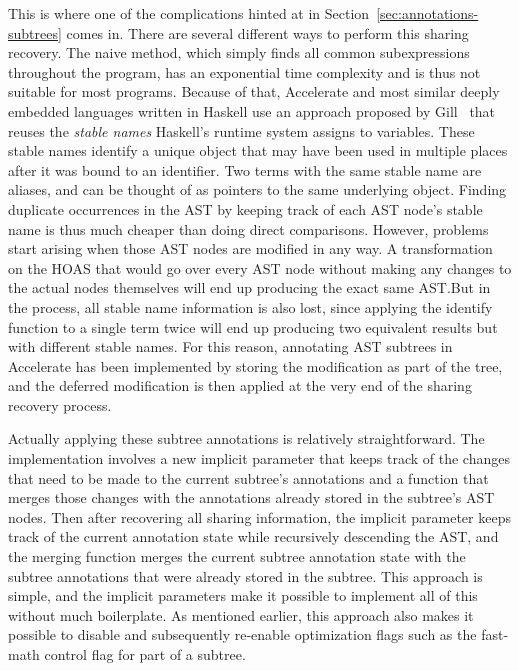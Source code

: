 \documentclass[fontsize=11pt,a4paper,parskip=half,numbers=noenddot]{scrartcl}
\begin{document}
This is where one of the complications hinted at in
Section~\ref{sec:annotations-subtrees} comes in. There are several different
ways to perform this sharing recovery. The naive method, which simply finds all
common subexpressions throughout the program, has an exponential time complexity
and is thus not suitable for most programs. Because of that, Accelerate and most
similar deeply embedded languages written in Haskell use an approach proposed by
Gill~\cite{gill2009type} that reuses the \emph{stable names} Haskell's runtime
system assigns to variables. These stable names identify a unique object that
may have been used in multiple places after it was bound to an identifier. Two
terms with the same stable name are aliases, and can be thought of as pointers
to the same underlying object. Finding duplicate occurrences in the AST by
keeping track of each AST node's stable name is thus much cheaper than doing
direct comparisons. However, problems start arising when those AST nodes are
modified in any way. A transformation on the HOAS that would go over every AST
node without making any changes to the actual nodes themselves will end up
producing the exact same AST.\@ But in the process, all stable name information
is also lost, since applying the identify function to a single term twice will
end up producing two equivalent results but with different stable names. For
this reason, annotating AST subtrees in Accelerate has been implemented by
storing the modification as part of the tree, and the deferred modification is
then applied at the very end of the sharing recovery process.

Actually applying these subtree annotations is relatively straightforward. The
implementation involves a new implicit parameter that keeps track of the changes
that need to be made to the current subtree's annotations and a function that
merges those changes with the annotations already stored in the subtree's AST
nodes. Then after recovering all sharing information, the implicit parameter
keeps track of the current annotation state while recursively descending the
AST, and the merging function merges the current subtree annotation state with
the subtree annotations that were already stored in the subtree. This approach
is simple, and the implicit parameters make it possible to implement all of this
without much boilerplate. As mentioned earlier, this approach also makes it
possible to disable and subsequently re-enable optimization flags such as the
fast-math control flag for part of a subtree.
\end{document}
